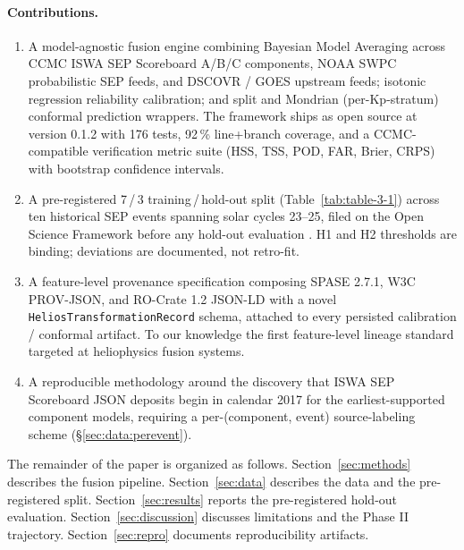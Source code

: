 \documentclass[11pt,letterpaper]{article}
\begin{document}
\paragraph{Contributions.}
\begin{enumerate}[leftmargin=*,itemsep=0pt]
  \item A model-agnostic fusion engine combining Bayesian Model Averaging
        across CCMC ISWA SEP Scoreboard A/B/C components, NOAA SWPC
        probabilistic SEP feeds, and DSCOVR / GOES upstream feeds; isotonic
        regression reliability calibration; and split and Mondrian
        (per-Kp-stratum) conformal prediction wrappers.  The framework
        ships as open source \cite{helios_fusion_engine} at version 0.1.2
        with 176 tests, 92\,\% line+branch coverage, and a CCMC-compatible
        verification metric suite (HSS, TSS, POD, FAR, Brier, CRPS) with
        bootstrap confidence intervals.
  \item A pre-registered 7\,/\,3 training\,/\,hold-out split (Table~\ref{tab:table-3-1})
        across ten historical SEP events spanning solar cycles 23--25,
        filed on the Open Science Framework before any hold-out
        evaluation \cite{osf_prereg}.  H1 and H2 thresholds are binding;
        deviations are documented, not retro-fit.
  \item A feature-level provenance specification \cite{helios_provenance_spec}
        composing SPASE 2.7.1, W3C PROV-JSON, and RO-Crate 1.2 JSON-LD with
        a novel \texttt{HeliosTransformationRecord} schema, attached to
        every persisted calibration / conformal artifact.  To our knowledge
        the first feature-level lineage standard targeted at heliophysics
        fusion systems.
  \item A reproducible methodology around the discovery that ISWA SEP
        Scoreboard JSON deposits begin in calendar 2017 for the
        earliest-supported component models, requiring a
        per-(component, event) source-labeling scheme
        (§\ref{sec:data:perevent}).
\end{enumerate}

The remainder of the paper is organized as follows.
Section~\ref{sec:methods} describes the fusion pipeline.
Section~\ref{sec:data} describes the data and the pre-registered split.
Section~\ref{sec:results} reports the pre-registered hold-out evaluation.
Section~\ref{sec:discussion} discusses limitations and the Phase II
trajectory.  Section~\ref{sec:repro} documents reproducibility artifacts.
\end{document}
